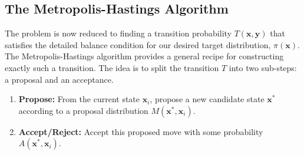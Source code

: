 \subsection{The Metropolis-Hastings Algorithm}
The problem is now reduced to finding a transition probability $T(\mathbf{x}, \mathbf{y})$ that satisfies the detailed balance condition for our desired target distribution, $\pi(\mathbf{x})$. The Metropolis-Hastings algorithm provides a general recipe for constructing exactly such a transition. The idea is to split the transition $T$ into two sub-steps: a proposal and an acceptance.
\begin{enumerate}
    \item \textbf{Propose:} From the current state $\mathbf{x}_i$, propose a new candidate state $\mathbf{x}^*$ according to a proposal distribution $M(\mathbf{x}^*, \mathbf{x}_i)$.
    \item \textbf{Accept/Reject:} Accept this proposed move with some probability $A(\mathbf{x}^*, \mathbf{x}_i)$.
\end{enumerate}

